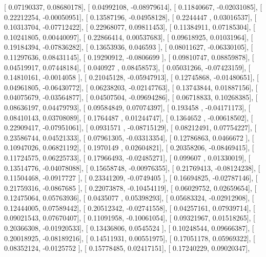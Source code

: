 \documentclass{article}
\begin{document}
       [ 0.07190337,  0.08680178],
       [ 0.04992108, -0.08979614],
       [ 0.11840667, -0.02031085],
       [ 0.22212254, -0.00050951],
       [ 0.13587196, -0.04958128],
       [ 0.2244447 ,  0.03016537],
       [ 0.10313704, -0.07712422],
       [ 0.22968077,  0.09811453],
       [ 0.11384911,  0.07185304],
       [ 0.10241805,  0.00440097],
       [ 0.22866414,  0.00537683],
       [ 0.09618925,  0.01031964],
       [ 0.19184394, -0.07836282],
       [ 0.13653936,  0.046593  ],
       [ 0.08011627, -0.06330105],
       [ 0.11297636,  0.08431145],
       [ 0.19290912, -0.0806699 ],
       [ 0.09810747,  0.08859878],
       [ 0.04519917,  0.07448184],
       [ 0.040927  ,  0.08458573],
       [ 0.05031266, -0.07423159],
       [ 0.14810161, -0.0014058 ],
       [ 0.21045128, -0.05947913],
       [ 0.12745868, -0.01480651],
       [ 0.04961805, -0.06430772],
       [ 0.06238203, -0.02147763],
       [ 0.13743844,  0.01887156],
       [ 0.04075679, -0.03564877],
       [ 0.04507504, -0.09694286],
       [ 0.06718833,  0.10268385],
       [ 0.08636197,  0.04479793],
       [ 0.09584849,  0.07074397],
       [ 0.193458  , -0.04171173],
       [ 0.08410143,  0.03708089],
       [ 0.1764487 ,  0.01244747],
       [ 0.1364652 , -0.00618502],
       [ 0.22909417, -0.07951061],
       [ 0.0931571 , -0.08715129],
       [ 0.08212491,  0.07754227],
       [ 0.23586744,  0.04521333],
       [ 0.07961305, -0.03313354],
       [ 0.12786863,  0.0466672 ],
       [ 0.10947026,  0.06821192],
       [ 0.1970149 ,  0.02604821],
       [ 0.20358206, -0.08469415],
       [ 0.11724575,  0.06225733],
       [ 0.17966493, -0.02485271],
       [ 0.099607  ,  0.01330019],
       [ 0.13514776, -0.04078088],
       [ 0.15658748, -0.00976355],
       [ 0.21769413, -0.08124238],
       [ 0.11504468, -0.0917727 ],
       [ 0.23341209, -0.0749405 ],
       [ 0.16694825, -0.02787146],
       [ 0.21759316, -0.0867685 ],
       [ 0.22073878, -0.10454119],
       [ 0.06029752,  0.02659654],
       [ 0.12475064,  0.05763936],
       [ 0.0435077 ,  0.05398293],
       [ 0.05683324, -0.02912908],
       [ 0.12444005,  0.07589442],
       [ 0.20512342, -0.02741558],
       [ 0.04257161,  0.07939714],
       [ 0.09021543,  0.07670407],
       [ 0.11091958, -0.10061054],
       [ 0.09321967,  0.01518265],
       [ 0.20366308, -0.01920533],
       [ 0.13436806,  0.0545524 ],
       [ 0.10248544,  0.09666387],
       [ 0.20018925, -0.08189216],
       [ 0.14511931,  0.00551975],
       [ 0.17051178,  0.05969322],
       [ 0.08352124, -0.0125752 ],
       [ 0.15778485,  0.02417151],
       [ 0.17240229,  0.09020347],
\end{document}
